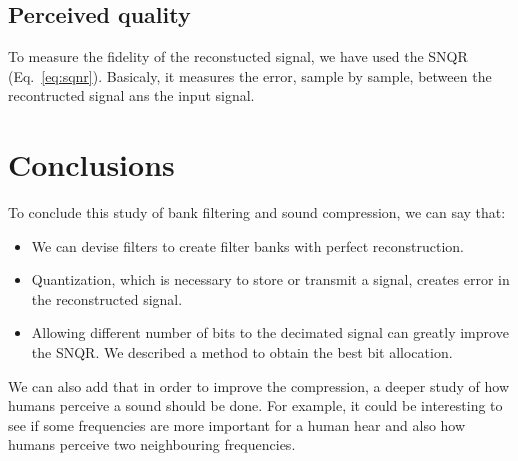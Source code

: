 \documentclass[a4paper,twocolumn]{article}
\begin{document}
\subsection{Perceived quality}
To measure the fidelity of the reconstucted signal, we have used the SNQR (Eq.~\ref{eq:sqnr}). Basicaly, it measures the error, sample by sample, between the recontructed signal ans the input signal.



\section{Conclusions}
\label{sec:conclusions}

To conclude this study of bank filtering and sound compression, we can say that:
\begin{itemize}
\item We can devise filters to create filter banks with perfect reconstruction.
\item Quantization, which is necessary to store or transmit a signal, creates error in the reconstructed signal.
\item Allowing different number of bits to the decimated signal can greatly improve the SNQR. We described a method to obtain the best bit allocation.
\end{itemize}

We can also add that in order to improve the compression, a deeper study of how humans perceive a sound should be done. For example, it could be interesting to see if some frequencies are more important for a human hear and also how humans perceive two neighbouring frequencies.
\end{document}
